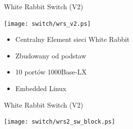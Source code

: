 \documentclass[compress,red]{beamer}
\begin{document}
\begin{frame}{White Rabbit Switch (V2)}

    \begin{center}
    \texttt{[image: switch/wrs\_v2.ps]}
    \end{center}

	\begin{itemize}
	\item Centralny Element sieci White Rabbit
	\item Zbudowany od podstaw
	\item 10 portów 1000Base-LX 
	\item Embedded Linux
	\end{itemize}
\end{frame}
\begin{frame}{White Rabbit Switch (V2)}

    \begin{center}
    \texttt{[image: switch/wrs2\_sw\_block.ps]}
    \end{center}


\end{frame}
\end{document}
